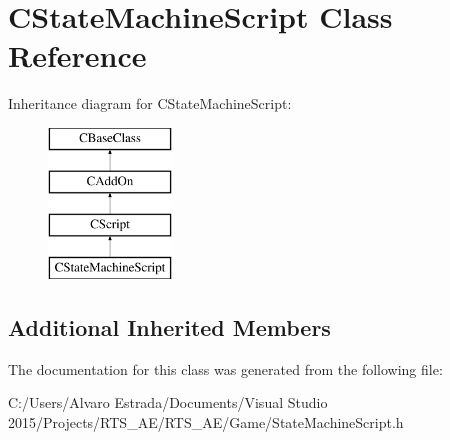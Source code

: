 \hypertarget{class_c_state_machine_script}{}\section{C\+State\+Machine\+Script Class Reference}
\label{class_c_state_machine_script}
Inheritance diagram for C\+State\+Machine\+Script\+:\begin{figure}[H]
\begin{center}
\leavevmode
\includegraphics[height=4.000000cm]{class_c_state_machine_script}
\end{center}
\end{figure}
\subsection*{Additional Inherited Members}


The documentation for this class was generated from the following file\+:\begin{DoxyCompactItemize}
\item 
C\+:/\+Users/\+Alvaro Estrada/\+Documents/\+Visual Studio 2015/\+Projects/\+R\+T\+S\+\_\+\+A\+E/\+R\+T\+S\+\_\+\+A\+E/\+Game/State\+Machine\+Script.\+h\end{DoxyCompactItemize}
